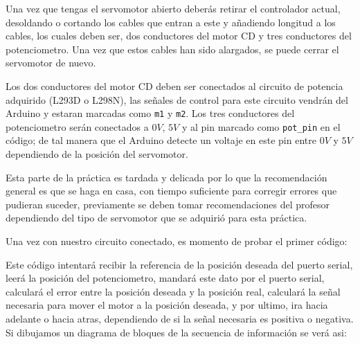 		Una vez que tengas el servomotor abierto deberás retirar el controlador actual, desoldando o cortando los cables que entran a este y añadiendo longitud a los cables, los cuales deben ser, dos conductores del motor CD y tres conductores del potenciometro. Una vez que estos cables han sido alargados, se puede cerrar el servomotor de nuevo.

		Los dos conductores del motor CD deben ser conectados al circuito de potencia adquirido (L293D o L298N), las señales de control para este circuito vendrán del Arduino y estaran marcadas como \texttt{m1} y \texttt{m2}. Los tres conductores del potenciometro serán conectados a $0V$, $5V$ y al pin marcado como \texttt{pot\_pin} en el código; de tal manera que el Arduino detecte un voltaje en este pin entre $0V$ y $5V$ dependiendo de la posición del servomotor.

		Esta parte de la práctica es tardada y delicada por lo que la recomendación general es que se haga en casa, con tiempo suficiente para corregir errores que pudieran suceder, previamente se deben tomar recomendaciones del profesor dependiendo del tipo de servomotor que se adquirió para esta práctica.
		\newpage

		Una vez con nuestro circuito conectado, es momento de probar el primer código:

		\begin{fullwidth}
			\begin{multicols}{2}
				
			\end{multicols}
		\end{fullwidth}

		Este código intentará recibir la referencia de la posición deseada del puerto serial, leerá la posición del potenciometro, mandará este dato por el puerto serial, calculará el error entre la posición deseada y la posición real, calculará la señal necesaria para mover el motor a la posición deseada, y por ultimo, ira hacia adelante o hacia atras, dependiendo de si la señal necesaria es positiva o negativa. Si dibujamos un diagrama de bloques de la secuencia de información se verá asi:

